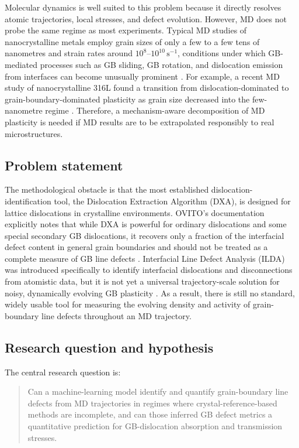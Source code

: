 \documentclass[11pt]{article}
\begin{document}
Molecular dynamics is well suited to this problem because it directly resolves atomic trajectories, local stresses, and defect evolution. However, MD does not probe the same regime as most experiments. Typical MD studies of nanocrystalline metals employ grain sizes of only a few to a few tens of nanometres and strain rates around $10^{8}$--$10^{10}\,\mathrm{s^{-1}}$, conditions under which GB-mediated processes such as GB sliding, GB rotation, and dislocation emission from interfaces can become unusually prominent \cite{Materials2020,Huang2019}. For example, a recent MD study of nanocrystalline 316L found a transition from dislocation-dominated to grain-boundary-dominated plasticity as grain size decreased into the few-nanometre regime \cite{Materials2020}. Therefore, a mechanism-aware decomposition of MD plasticity is needed if MD results are to be extrapolated responsibly to real microstructures.

\subsection*{Problem statement}
The methodological obstacle is that the most established dislocation-identification tool, the Dislocation Extraction Algorithm (DXA), is designed for lattice dislocations in crystalline environments. OVITO's documentation explicitly notes that while DXA is powerful for ordinary dislocations and some special secondary GB dislocations, it recovers only a fraction of the interfacial defect content in general grain boundaries and should not be treated as a complete measure of GB line defects \cite{OVITODXA}. Interfacial Line Defect Analysis (ILDA) was introduced specifically to identify interfacial dislocations and disconnections from atomistic data, but it is not yet a universal trajectory-scale solution for noisy, dynamically evolving GB plasticity \cite{Deka2023}. As a result, there is still no standard, widely usable tool for measuring the evolving density and activity of grain-boundary line defects throughout an MD trajectory.

\subsection*{Research question and hypothesis}
The central research question is:

\begin{quote}
Can a machine-learning model identify and quantify grain-boundary line defects from MD trajectories in regimes where crystal-reference-based methods are incomplete, and can those inferred GB defect metrics a quantitative prediction for GB-dislocation absorption and transmission stresses.
\end{quote}
\end{document}
